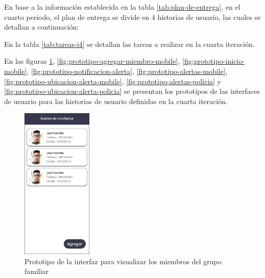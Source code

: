 En base a la información establecida en la tabla \ref{tab:plan-de-entrega}, en el cuarto periodo, el plan de
entrega se divide en 4 historias de usuario, las cuales se detallan a continuación:



En la tabla \ref{tab:tareas-i4} se detallan las tareas a realizar en la cuarta iteración.



En las figuras \ref{fig:prototipo-grupo-familiar-mobile}, \ref{fig:prototipo-agregar-miembro-mobile},
\ref{fig:prototipo-inicio-mobile}, \ref{fig:prototipo-notificacion-alerta}, \ref{fig:prototipo-alertas-mobile},
\ref{fig:prototipo-ubicacion-alerta-mobile}, \ref{fig:prototipo-alertas-policia} y
\ref{fig:prototipo-ubicacion-alerta-policia} se presentan los prototipos de las interfaces de usuario para las
historias de usuario definidas en la cuarta iteración.

\begin{figure}[H]
      \centering
      \includegraphics[width=0.3\textwidth]{chapters/III-resultados-y-discusion/resources/images/prototipo-grupo-familiar-mobile.png}
      \caption{Prototipo de la interfaz para visualizar los miembros del grupo familiar}
      \label{fig:prototipo-grupo-familiar-mobile}
\end{figure}

